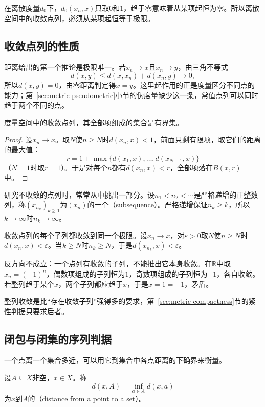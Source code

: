 在离散度量$d_0$下，$d_0(x_n,x)$只取$0$和$1$，趋于零意味着从某项起恒为零。所以离散空间中的收敛点列，必须从某项起恒等于极限。

\subsection{收敛点列的性质}
\label{sec:metric-convergent-properties}

距离给出的第一个推论是极限唯一。若$x_n\to x$且$x_n\to y$，由三角不等式
\[
d(x,y)\leq d(x,x_n)+d(x_n,y)\to0,
\]
所以$d(x,y)=0$，由零距离判定得$x=y$。这里起作用的正是度量区分不同点的能力；第~\ref{sec:metric-pseudometric}小节的伪度量缺少这一条，常值点列可以同时趋于两个不同的点。

\begin{theorem}[收敛点列有界]
\label{thm:metric-convergent-bounded}
度量空间中的收敛点列，其全部项组成的集合是有界集。
\end{theorem}

\begin{proof}
设$x_n\to x$。取$N$使$n\geq N$时$d(x_n,x)<1$，前面只剩有限项，取它们的距离的最大值：
\[
r=1+\max\{d(x_1,x),\ldots,d(x_{N-1},x)\}
\]
（$N=1$时取$r=1$）。于是对每个$n$都有$d(x_n,x)<r$，全部项落在$B(x,r)$中。
\end{proof}

研究不收敛的点列时，常常从中挑出一部分。设$n_1<n_2<\cdots$是严格递增的正整数列，称$(x_{n_k})_{k\geq1}$为$(x_n)$的一个（subsequence）。严格递增保证$n_k\geq k$，所以$k\to\infty$时$n_k\to\infty$。

收敛点列的每个子列都收敛到同一个极限。设$x_n\to x$，对$\varepsilon>0$取$N$使$n\geq N$时$d(x_n,x)<\varepsilon$。当$k\geq N$时$n_k\geq N$，于是$d(x_{n_k},x)<\varepsilon$。

反方向不成立：一个点列有收敛的子列，不能推出它本身收敛。在$\mathbb R$中取$x_n=(-1)^n$，偶数项组成的子列恒为$1$，奇数项组成的子列恒为$-1$，各自收敛。若整列趋于某个$x$，两个子列都应趋于$x$，于是$x=1=-1$，矛盾。

整列收敛是比“存在收敛子列”强得多的要求，第~\ref{sec:metric-compactness}节的紧性判据只要求后者。

\subsection{闭包与闭集的序列判据}
\label{sec:metric-closure-sequences}

一个点离一个集合多近，可以用它到集合中各点距离的下确界来衡量。

\begin{definition}[点到集合的距离]
\label{def:metric-point-set-distance}
设$A\subseteq X$非空，$x\in X$。称
\begin{equation}
d(x,A)=\inf_{a\in A}d(x,a)
\label{eq:metric-point-set-distance}
\end{equation}
为$x$到$A$的（distance from a point to a set）。
\end{definition}

